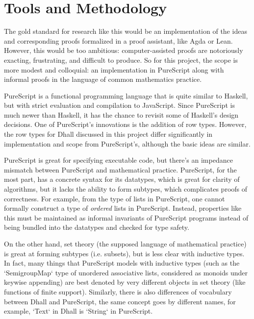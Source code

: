 \documentclass[11pt, twoside, reqno]{book}
\begin{document}
\section{Tools and Methodology}
\label{methods}

The gold standard for research like this would be an implementation of the ideas and corresponding proofs formalized in a proof assistant, like Agda or Lean.
However, this would be too ambitious: computer-assisted proofs are notoriously exacting, frustrating, and difficult to produce.
So for this project, the scope is more modest and colloquial: an implementation in PureScript along with informal proofs in the language of common mathematics practice.

PureScript is a functional programming language that is quite similar to Haskell, but with strict evaluation and compilation to JavaScript.
Since PureScript is much newer than Haskell, it has the chance to revisit some of Haskell's design decisions.
One of PureScript's innovations is the addition of row types.
However, the row types for Dhall discussed in this project differ significantly in implementation and scope from PureScript's, although the basic ideas are similar.

PureScript is great for specifying executable code, but there's an impedance mismatch between PureScript and mathematical practice.
PureScript, for the most part, has a concrete syntax for its datatypes, which is great for clarity of algorithms, but it lacks the ability to form subtypes, which complicates proofs of correctness.
For example, from the type of lists in PureScript, one cannot formally construct a type of \emph{ordered} lists in PureScript.
Instead, properties like this must be maintained as informal invariants of PureScript programs instead of being bundled into the datatypes and checked for type safety.

On the other hand, set theory (the supposed language of mathematical practice) is great at forming subtypes (i.e. subsets), but is less clear with inductive types.
In fact, many things that PureScript models with inductive types (such as the \inHS`SemigroupMap` type of unordered associative lists, considered as monoids under keywise appending) are best denoted by very different objects in set theory (like functions of finite support).
Similarly, there is also differences of vocabulary between Dhall and PureScript, the same concept goes by different names, for example, \inHS`Text` in Dhall is \inHS`String` in PureScript.
\end{document}
